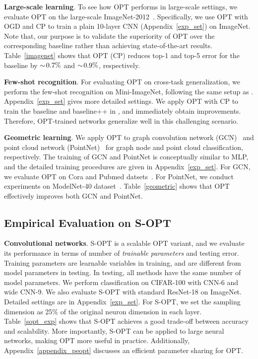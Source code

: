 \textbf{Large-scale learning}. To see how OPT performs in large-scale settings, we evaluate OPT on the large-scale ImageNet-2012~\cite{russakovsky2015imagenet}. Specifically, we use OPT with OGD and CP to train a plain 10-layer CNN (Appendix~\ref{exp_set}) on ImageNet. Note that, our purpose is to validate the superiority of OPT over the corresponding baseline rather than achieving state-of-the-art results. Table~\ref{imagenet} shows that OPT (CP) reduces top-1 and top-5 error for the baseline by $\thickmuskip=2mu \medmuskip=2mu \sim0.7\%$ and $\thickmuskip=2mu \medmuskip=2mu \sim0.9\%$, respectively.

\textbf{Few-shot recognition}. For evaluating OPT on cross-task generalization, we perform the few-shot recognition on Mini-ImageNet, following the same setup as \cite{chen2019closer}. Appendix~\ref{exp_set} gives more detailed settings. We apply OPT with CP to train the baseline and baseline++ in \cite{chen2019closer}, and immediately obtain improvements. Therefore, OPT-trained networks generalize well in this challenging scenario. 

\textbf{Geometric learning}. We apply OPT to graph convolution network (GCN)~\cite{kipf2016semi} and point cloud network (PointNet)~\cite{qi2017pointnet} for graph node and point cloud classification, respectively. The training of GCN and PointNet is conceptually similar to MLP, and the detailed training procedures are given in Appendix~\ref{exp_set}. For GCN, we evaluate OPT on Cora and Pubmed datsets~\cite{sen2008collective}. For PointNet, we conduct experiments on ModelNet-40 dataset~\cite{wu20153d}. Table~\ref{geometric} shows that OPT effectively improves both GCN and PointNet.

\subsection{Empirical Evaluation on S-OPT}\label{sopt_sect}

\textbf{Convolutional networks}. S-OPT is a scalable OPT variant, and we evaluate its performance in terms of number of \emph{trainable parameters} and testing error. Training parameters are learnable variables in training, and are different from model parameters in testing. In testing, all methods have the same number of model parameters. We perform classification on CIFAR-100 with CNN-6 and wide CNN-9. We also evaluate S-OPT with standard ResNet-18 on ImageNet. Detailed settings are in Appendix~\ref{exp_set}. For S-OPT, we set the sampling dimension as 25\% of the original neuron dimension in each layer. Table~\ref{sopt_exp} shows that S-OPT achieves a good trade-off between accuracy and scalability. More importantly, S-OPT can be applied to large neural networks, making OPT more useful in practice. Additionally, Appendix~\ref{appendix_peopt} discusses an efficient parameter sharing for OPT.


